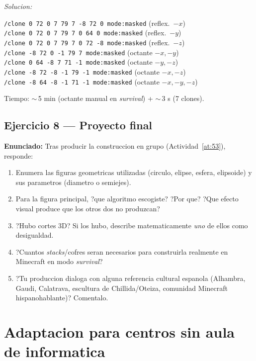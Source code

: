 \documentclass[12pt,a4paper]{scrartcl}
\newcommand{\cmd}[1]{\textcolor{earth}{\texttt{\small #1}}}
\begin{document}
\emph{Solucion:}

\begin{minecraft}
\cmd{/clone 0 72 0 7 79 7 -8 72 0 mode:masked} \quad (reflex.\ $-x$)\\
\cmd{/clone 0 72 0 7 79 7 0 64 0 mode:masked} \quad\quad (reflex.\ $-y$)\\
\cmd{/clone 0 72 0 7 79 7 0 72 -8 mode:masked} \quad (reflex.\ $-z$)\\
\cmd{/clone -8 72 0 -1 79 7 mode:masked} \quad\quad\;\; (octante $-x,-y$)\\
\cmd{/clone 0 64 -8 7 71 -1 mode:masked} \quad\quad\;\; (octante $-y,-z$)\\
\cmd{/clone -8 72 -8 -1 79 -1 mode:masked} \quad\;\; (octante $-x,-z$)\\
\cmd{/clone -8 64 -8 -1 71 -1 mode:masked} \quad\;\; (octante $-x,-y,-z$)
\end{minecraft}

Tiempo: $\sim$\,5 min (octante manual en \emph{survival}) + $\sim$\,3 s (7 clones).

\subsection*{Ejercicio 8 --- Proyecto final}
\textbf{Enunciado:} Tras producir la construccion en grupo (Actividad~\ref{at:53}), responde:
\begin{enumerate}[label=(\arabic*),leftmargin=1.7em,itemsep=0.15em,topsep=0.2em,nosep]
  \item Enumera las figuras geometricas utilizadas (circulo, elipse, esfera, elipsoide) y sus parametros (diametro o semiejes).
  \item Para la figura principal, ?que algoritmo escogiste? ?Por que? ?Que efecto visual produce que los otros dos no produzcan?
  \item ?Hubo cortes 3D? Si los hubo, describe matematicamente \emph{uno} de ellos como desigualdad.
  \item ?Cuantos \emph{stacks}/cofres seran necesarios para construirla realmente en Minecraft en modo \emph{survival}?
  \item ?Tu produccion dialoga con alguna referencia cultural espanola (Alhambra, Gaudi, Calatrava, escultura de Chillida/Oteiza, comunidad Minecraft hispanohablante)? Comentalo.
\end{enumerate}

\newpage
\section{Adaptacion para centros sin aula de informatica}\label{ap:adapt-analog}
\end{document}
